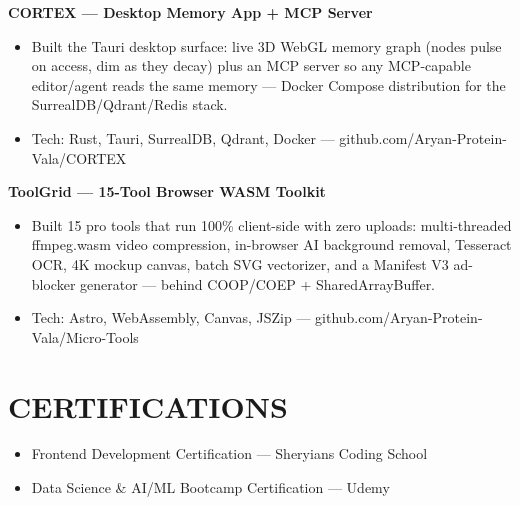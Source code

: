 \documentclass[9pt]{article}
\begin{document}
\textbf{CORTEX  ---  Desktop Memory App + MCP Server}
\vspace{1pt}
\begin{itemize}[leftmargin=11pt,itemsep=0pt,topsep=1pt,parsep=0pt]
\item Built the Tauri desktop surface: live 3D WebGL memory graph (nodes pulse on access, dim as they decay) plus an MCP server so any MCP-capable editor/agent reads the same memory  ---  Docker Compose distribution for the SurrealDB/Qdrant/Redis stack.
\item Tech: Rust, Tauri, SurrealDB, Qdrant, Docker  ---  github.com/Aryan-Protein-Vala/CORTEX
\end{itemize}
\textbf{ToolGrid  ---  15-Tool Browser WASM Toolkit}
\vspace{1pt}
\begin{itemize}[leftmargin=11pt,itemsep=0pt,topsep=1pt,parsep=0pt]
\item Built 15 pro tools that run 100\% client-side with zero uploads: multi-threaded ffmpeg.wasm video compression, in-browser AI background removal, Tesseract OCR, 4K mockup canvas, batch SVG vectorizer, and a Manifest V3 ad-blocker generator  ---  behind COOP/COEP + SharedArrayBuffer.
\item Tech: Astro, WebAssembly, Canvas, JSZip  ---  github.com/Aryan-Protein-Vala/Micro-Tools
\end{itemize}
\section*{CERTIFICATIONS}
\begin{itemize}[leftmargin=11pt,itemsep=0pt,topsep=1pt,parsep=0pt]
\item Frontend Development Certification  ---  Sheryians Coding School
\item Data Science \& AI/ML Bootcamp Certification  ---  Udemy
\end{itemize}
\end{document}
